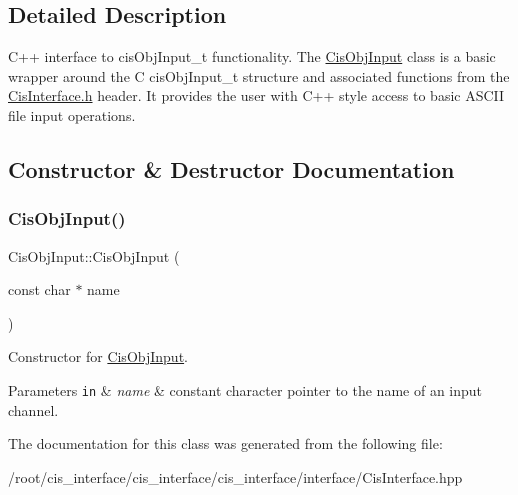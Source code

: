 \subsection{Detailed Description}
C++ interface to cis\+Obj\+Input\+\_\+t functionality. The \mbox{\hyperlink{classCisObjInput}{Cis\+Obj\+Input}} class is a basic wrapper around the C cis\+Obj\+Input\+\_\+t structure and associated functions from the \mbox{\hyperlink{CisInterface_8h_source}{Cis\+Interface.\+h}} header. It provides the user with C++ style access to basic A\+S\+C\+II file input operations. 

\subsection{Constructor \& Destructor Documentation}
\mbox{\label{classCisObjInput_a76dfa86d8de7415db586f5993271c5fe}} 
\subsubsection{\texorpdfstring{Cis\+Obj\+Input()}{CisObjInput()}}
{\footnotesize\ttfamily Cis\+Obj\+Input\+::\+Cis\+Obj\+Input (\begin{DoxyParamCaption}\item[{const char $\ast$}]{name }\end{DoxyParamCaption})\hspace{0.3cm}{\ttfamily [inline]}}



Constructor for \mbox{\hyperlink{classCisObjInput}{Cis\+Obj\+Input}}. 


\begin{DoxyParams}[1]{Parameters}
\mbox{\tt in}  & {\em name} & constant character pointer to the name of an input channel. \\
\hline
\end{DoxyParams}


The documentation for this class was generated from the following file\+:\begin{DoxyCompactItemize}
\item 
/root/cis\+\_\+interface/cis\+\_\+interface/cis\+\_\+interface/interface/Cis\+Interface.\+hpp\end{DoxyCompactItemize}
